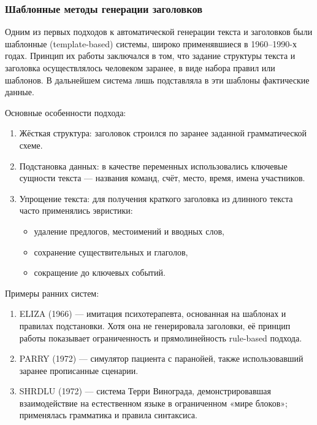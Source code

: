 \documentclass[coursework]{SCWorks}
\begin{document}
    \subsubsection{Шаблонные методы генерации заголовков}
    Одним из первых подходов к автоматической генерации текста и заголовков были шаблонные (template-based) системы, широко применявшиеся в 1960–1990-х годах. Принцип их работы заключался в том, что задание структуры текста и заголовка осуществлялось человеком заранее, в виде набора правил или шаблонов. В дальнейшем система лишь подставляла в эти шаблоны фактические данные.

    Основные особенности подхода:
    \begin{enumerate}
        \item Жёсткая структура: заголовок строился по заранее заданной грамматической схеме.
        \item Подстановка данных: в качестве переменных использовались ключевые сущности текста — названия команд, счёт, место, время, имена участников.
        \item Упрощение текста: для получения краткого заголовка из длинного текста часто применялись эвристики:
        \begin{itemize}
            \item удаление предлогов, местоимений и вводных слов,
            \item сохранение существительных и глаголов,
            \item сокращение до ключевых событий.
        \end{itemize}
    \end{enumerate}

    Примеры ранних систем:
    \begin{enumerate}
        \item ELIZA (1966) — имитация психотерапевта, основанная на шаблонах и правилах подстановки.
        Хотя она не генерировала заголовки, её принцип работы показывает ограниченность и прямолинейность rule-based подхода\cite{weizenbaum1966}.
        \item PARRY (1972) — симулятор пациента с паранойей, также использовавший заранее прописанные сценарии\cite{colby1972}.
        \item SHRDLU (1972) — система Терри Винограда, демонстрировавшая взаимодействие на естественном языке в ограниченном «мире блоков»; применялась грамматика и правила синтаксиса\cite{winograd1972}.
    \end{enumerate}
\end{document}
